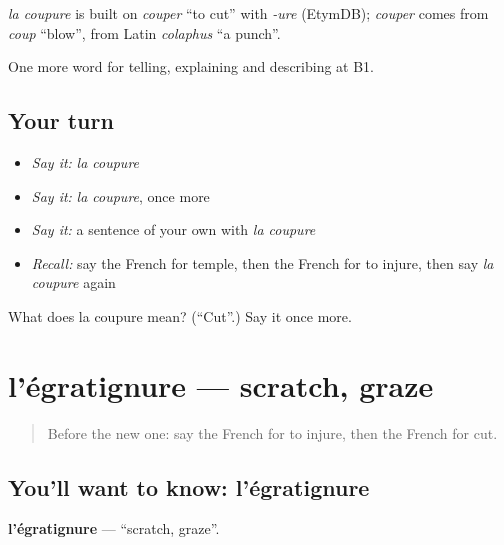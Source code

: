 \begin{cousinweb}
\emph{la coupure} is built on \emph{couper} \textquotedblleft{}to cut\textquotedblright{} with \emph{-ure} (EtymDB); \emph{couper} comes from \emph{coup} \textquotedblleft{}blow\textquotedblright{}, from Latin \emph{colaphus} \textquotedblleft{}a punch\textquotedblright{}.
\end{cousinweb}

\begin{grammarlens}[title={What you've built}]
One more word for telling, explaining and describing at B1.
\end{grammarlens}

\subsection*{Your turn}
\begin{itemize}
\raggedright
  \item \emph{Say it:} \emph{la coupure}
  \item \emph{Say it:} \emph{la coupure}, once more
  \item \emph{Say it:} a sentence of your own with \emph{la coupure}
  \item \emph{Recall:} say the French for temple, then the French for to injure, then say \emph{la coupure} again
\end{itemize}

\begin{tcolorbox}[breakable,colback=teal!4,colframe=teal!35!black,title={Before you move on}]
What does la coupure mean? (\textquotedblleft{}Cut\textquotedblright{}.) Say it once more.
\end{tcolorbox}
\section[l'égratignure]{l'égratignure — scratch, graze}

\label{lesson:FR-C479-egratignure}



\begin{quote}
Before the new one: say the French for to injure, then the French for cut.
\end{quote}

\subsection*{You'll want to know: l'égratignure}
\textbf{l'égratignure} — \textquotedblleft{}scratch, graze\textquotedblright{}.

